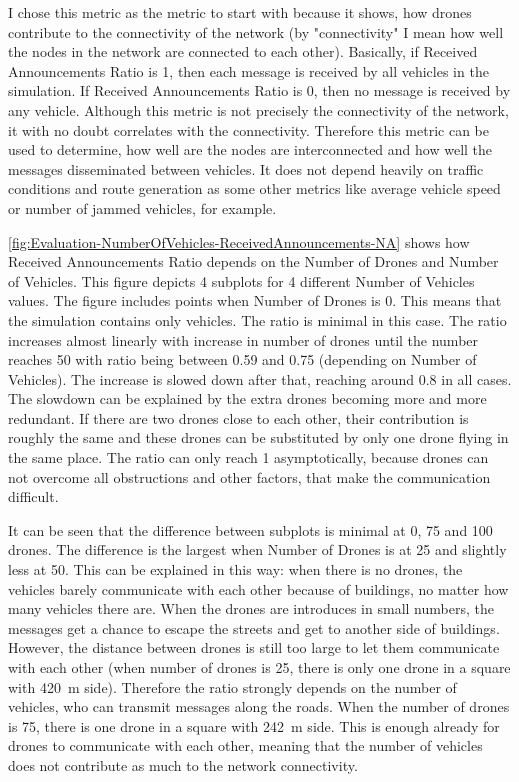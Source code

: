 \documentclass[]{nsm-thesis}
\begin{document}
I chose this metric as the metric to start with because it shows, how drones contribute to the connectivity of the network (by "connectivity" I mean how well the nodes in the network are connected to each other). Basically, if Received Announcements Ratio is 1, then each message is received by all vehicles in the simulation. If Received Announcements Ratio is 0, then no message is received by any vehicle. Although this metric is not precisely the connectivity of the network, it with no doubt correlates with the connectivity. Therefore this metric can be used to determine, how well are the nodes are interconnected and how well the messages disseminated between vehicles. It does not depend heavily on traffic conditions and route generation as some other metrics like average vehicle speed or number of jammed vehicles, for example.

\cref{fig:Evaluation-NumberOfVehicles-ReceivedAnnouncements-NA} shows how Received Announcements Ratio depends on the Number of Drones and Number of Vehicles. This figure depicts 4 subplots for 4 different Number of Vehicles values. The figure includes points when Number of Drones is 0. This means that the simulation contains only vehicles. The ratio is minimal in this case. The ratio increases almost linearly with increase in number of drones until the number reaches 50 with ratio being between 0.59 and 0.75 (depending on Number of Vehicles). The increase is slowed down after that, reaching around 0.8 in all cases. The slowdown can be explained by the extra drones becoming more and more redundant. If there are two drones close to each other, their contribution is roughly the same and these drones can be substituted by only one drone flying in the same place. The ratio can only reach 1 asymptotically, because drones can not overcome all obstructions and other factors, that make the communication difficult.

It can be seen that the difference between subplots is minimal at 0, 75 and 100 drones. The difference is the largest when Number of Drones is at 25 and slightly less at 50. This can be explained in this way: when there is no drones, the vehicles barely communicate with each other because of buildings, no matter how many vehicles there are. When the drones are introduces in small numbers, the messages get a chance to escape the streets and get to another side of buildings. However, the distance between drones is still too large to let them communicate with each other (when number of drones is 25, there is only one drone in a square with \SI{420}{\meter} side). Therefore the ratio strongly depends on the number of vehicles, who can transmit messages along the roads. When the number of drones is 75, there is one drone in a square with \SI{242}{\meter} side. This is enough already for drones to communicate with each other, meaning that the number of vehicles does not contribute as much to the network connectivity.
\end{document}
